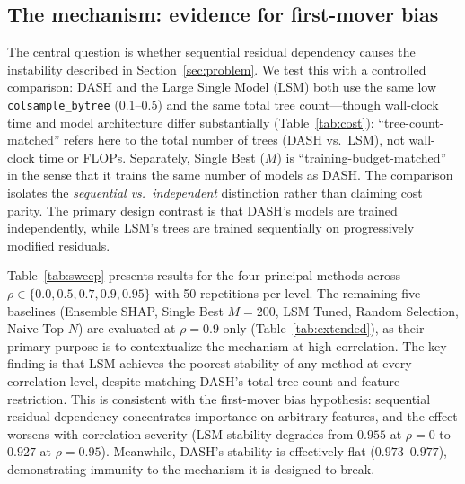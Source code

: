 \documentclass[10pt]{article}
\newcommand{\dash}{\textsc{DASH}}
\newcommand{\rhovar}{\rho}
\begin{document}
\subsection{The mechanism: evidence for first-mover bias}
\label{sec:mechanism_result}

The central question is whether sequential residual dependency causes
the instability described in Section~\ref{sec:problem}. We test this
with a controlled comparison: \dash{} and the Large Single Model (LSM)
both use the same low \texttt{colsample\_bytree} (0.1--0.5) and the same
total tree count---though wall-clock time and model architecture differ
substantially (Table~\ref{tab:cost}): ``tree-count-matched'' refers here to
the total number of trees (DASH vs.\ LSM), not wall-clock time or FLOPs.
Separately, Single Best ($M$) is ``training-budget-matched'' in the sense
that it trains the same number of models as DASH. The comparison isolates the
\emph{sequential vs.\ independent} distinction rather than claiming
cost parity. The primary design contrast is that \dash{}'s models
are trained independently, while LSM's trees are trained sequentially
on progressively modified residuals.

Table~\ref{tab:sweep} presents results for the four principal methods
across $\rhovar \in \{0.0, 0.5, 0.7, 0.9, 0.95\}$ with 50 repetitions per
level. The remaining five baselines (Ensemble SHAP, Single Best $M{=}200$,
LSM Tuned, Random Selection, Naive Top-$N$) are evaluated at
$\rhovar = 0.9$ only (Table~\ref{tab:extended}), as their primary
purpose is to contextualize the mechanism at high correlation. The key finding is that LSM achieves the poorest
stability of any method at every correlation level, despite matching
\dash{}'s total tree count and feature restriction. This is consistent
with the first-mover bias hypothesis: sequential residual dependency concentrates
importance on arbitrary features, and the effect worsens with
correlation severity (LSM stability degrades from $0.955$ at
$\rhovar = 0$ to $0.927$ at $\rhovar = 0.95$). Meanwhile, \dash{}'s
stability is effectively flat ($0.973$--$0.977$), demonstrating
immunity to the mechanism it is designed to break.
\end{document}
